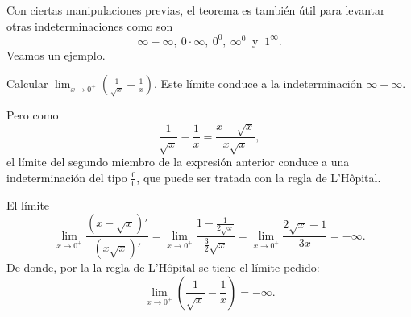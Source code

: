 Con ciertas manipulaciones previas, el teorema es también útil para levantar otras
indeterminaciones como son
\begin{equation*}
	\infty -\infty,\ 0\cdot \infty,\  0^{0},\  \infty^{0}\ \text{ y }\ 1^{\infty}.
\end{equation*}
Veamos un ejemplo.

\begin{exemplo}[Solución]{%
Calcular $\displaystyle\lim_{x\rightarrow 0^{+}}\left( \frac{1}{\sqrt{x}} -\frac{1}{x} \right)$.
}%
Este límite conduce a la indeterminación $\infty -\infty$.

Pero como
\begin{equation*}
	\frac{1}{\sqrt{x}} -\frac{1}{x}=\frac{x-\sqrt{x}}{x\sqrt{x}},
\end{equation*}
el límite del segundo miembro de la expresión anterior conduce a una indeterminación del tipo
$\frac{0}{0}$, que puede ser tratada con la regla de L'H\^{o}pital.

El límite
\begin{equation*}
	\lim_{x\rightarrow 0^{+}}\frac{(x-\sqrt{x})'}{(x\sqrt{x})'}=\lim_{x\rightarrow 0^{+}}
  \frac{1-\frac{1}{2\sqrt{x}}}{\frac{3}{2}\sqrt{x}}=\lim_{x\rightarrow 0^{+}}
  \frac{2\sqrt{x}-1}{3x}=-\infty.
\end{equation*}
De donde, por la la regla de L'H\^{o}pital se tiene el límite pedido:
\begin{equation*}
\lim_{x\rightarrow 0^{+}}\left( \frac{1}{\sqrt{x}} -\frac{1}{x}\right)= -\infty.
\end{equation*}
\end{exemplo}


